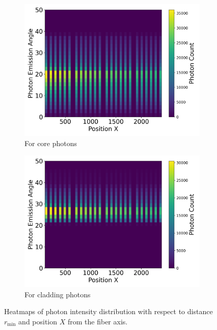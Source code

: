     \begin{figure}[H]
        \centering
        \begin{subfigure}[b]{0.48\textwidth}
            \centering
            \includegraphics[width=\textwidth, scale=0.35]{Figure/exciting-core.png}
            \caption{For core photons}
        \end{subfigure}
        \hfill
        \begin{subfigure}[b]{0.48\textwidth}
            \centering
            \includegraphics[width=\textwidth, scale=0.35]{Figure/exciting-clad.png}
            \caption{For cladding photons}
        \end{subfigure}
        \caption{Heatmaps of photon intensity distribution with respect to distance \( r_{\text{min}} \) and position $X$ from the fiber axis.}
        \label{dist_2}
    \end{figure}

